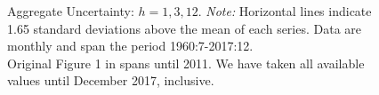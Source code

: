 \documentclass[a4paper,12pt,oneside,pointednumbers,bibtotoc,bigheadings,liststotoc]{scrbook}
\begin{document}
\begin{figure}[!ht]
   \centering
   \setlength\fboxsep{0pt}
   \setlength\fboxrule{0pt}
      \caption[Aggregate Uncertainty: $h = 1, 3, 12$.]{Aggregate Uncertainty: $h = 1, 3, 12$.
      \textit{Note:} Horizontal lines indicate 1.65 standard deviations above the mean of each series. Data are monthly and span the period 1960:7-2017:12.\\
      Original Figure 1 in \citet{juradoetal:15} spans until 2011. We have taken all available values until December 2017, inclusive.}   \label{fig:macroUncertainty_index}
\end{figure}
\end{document}
